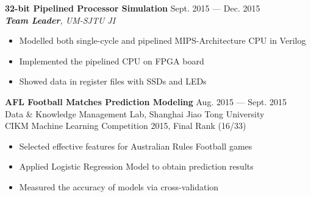 \documentclass[margin,line,11pt]{res}
\begin{document}
\begin{resume}
{
\small
{\bf 32-bit Pipelined Processor Simulation} \hfill Sept. 2015 --- Dec. 2015\\
{\it \textbf{Team Leader}, UM-SJTU JI}
}
\begin{itemize}
\setlength{\itemsep}{0pt}
\setlength{\parskip}{0pt}
\setlength{\parsep}{0pt}
\item {\small Modelled both single-cycle and pipelined MIPS-Architecture CPU in Verilog}
\item {\small Implemented the pipelined CPU on FPGA board}
\item {\small Showed data in register files with SSDs and LEDs}
\end{itemize}
{
\small
{\bf AFL Football Matches Prediction Modeling} \hfill Aug. 2015 --- Sept. 2015\\
{Data \& Knowledge Management Lab, Shanghai Jiao Tong University \\ CIKM Machine Learning Competition 2015, Final Rank (16/33)}
}
\begin{itemize}
\setlength{\itemsep}{0pt}
\setlength{\parskip}{0pt}
\setlength{\parsep}{0pt}
\item {\small Selected effective features for Australian Rules Football games}
\item {\small Applied Logistic Regression Model to obtain prediction results}
\item {\small Measured the accuracy of models via cross-validation}\\
\end{itemize}




\end{resume}
\end{document}
